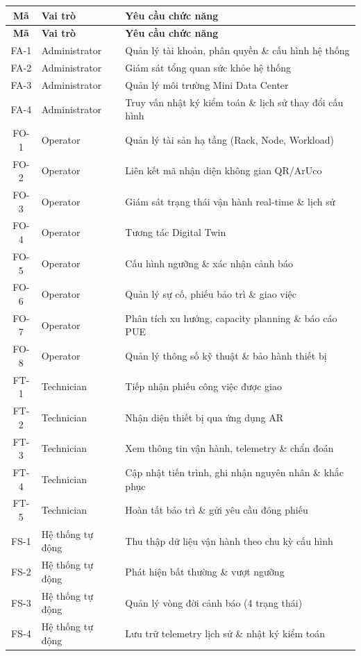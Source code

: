 \vspace{0.3em}
\begin{longtable}{|c|l|p{8.5cm}|}
\hline
\textbf{Mã} & \textbf{Vai trò} & \textbf{Yêu cầu chức năng} \\
\hline
\endfirsthead
\hline
\textbf{Mã} & \textbf{Vai trò} & \textbf{Yêu cầu chức năng} \\
\hline
\endhead
\hline
\endfoot
FA-1 & Administrator & Quản lý tài khoản, phân quyền \& cấu hình hệ thống \\
\hline
FA-2 & Administrator & Giám sát tổng quan sức khỏe hệ thống \\
\hline
FA-3 & Administrator & Quản lý môi trường Mini Data Center \\
\hline
FA-4 & Administrator & Truy vấn nhật ký kiểm toán \& lịch sử thay đổi cấu hình \\
\hline
FO-1 & Operator & Quản lý tài sản hạ tầng (Rack, Node, Workload) \\
\hline
FO-2 & Operator & Liên kết mã nhận diện không gian QR/ArUco \\
\hline
FO-3 & Operator & Giám sát trạng thái vận hành real-time \& lịch sử \\
\hline
FO-4 & Operator & Tương tác Digital Twin \\
\hline
FO-5 & Operator & Cấu hình ngưỡng \& xác nhận cảnh báo \\
\hline
FO-6 & Operator & Quản lý sự cố, phiếu bảo trì \& giao việc \\
\hline
FO-7 & Operator & Phân tích xu hướng, capacity planning \& báo cáo PUE \\
\hline
FO-8 & Operator & Quản lý thông số kỹ thuật \& bảo hành thiết bị \\
\hline
FT-1 & Technician & Tiếp nhận phiếu công việc được giao \\
\hline
FT-2 & Technician & Nhận diện thiết bị qua ứng dụng AR \\
\hline
FT-3 & Technician & Xem thông tin vận hành, telemetry \& chẩn đoán \\
\hline
FT-4 & Technician & Cập nhật tiến trình, ghi nhận nguyên nhân \& khắc phục \\
\hline
FT-5 & Technician & Hoàn tất bảo trì \& gửi yêu cầu đóng phiếu \\
\hline
FS-1 & Hệ thống tự động & Thu thập dữ liệu vận hành theo chu kỳ cấu hình \\
\hline
FS-2 & Hệ thống tự động & Phát hiện bất thường \& vượt ngưỡng \\
\hline
FS-3 & Hệ thống tự động & Quản lý vòng đời cảnh báo (4 trạng thái) \\
\hline
FS-4 & Hệ thống tự động & Lưu trữ telemetry lịch sử \& nhật ký kiểm toán \\
\hline
\end{longtable}

